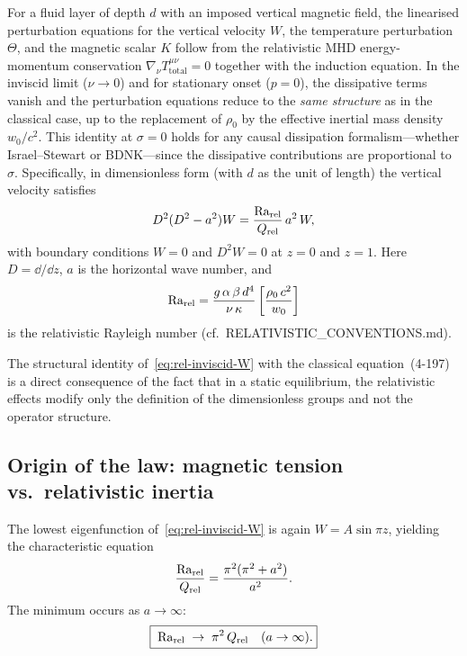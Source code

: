 For a fluid layer of depth $d$ with an imposed vertical magnetic field,
the linearised perturbation equations for the vertical velocity $W$,
the temperature perturbation $\Theta$, and the magnetic scalar $K$
follow from the relativistic MHD energy-momentum conservation
$\nabla_{\nu}T^{\mu\nu}_{\mathrm{total}} = 0$ together with the
induction equation.  In the inviscid limit ($\nu\to 0$) and for
stationary onset ($p = 0$), the dissipative terms vanish
and the perturbation equations reduce to the \emph{same structure}
as in the classical case, up to the replacement of $\rho_{0}$ by the
effective inertial mass density $w_{0}/c^{2}$.  This identity at
$\sigma=0$ holds for any causal dissipation formalism---whether
Israel--Stewart or BDNK---since the dissipative contributions are
proportional to~$\sigma$.  Specifically, in
dimensionless form (with $d$ as the unit of length) the vertical
velocity satisfies
\begin{equation}
  D^{2}(D^{2}-a^{2})W = \frac{\mathrm{Ra}_{\mathrm{rel}}}{Q_{\mathrm{rel}}}\,a^{2}\,W ,
  \label{eq:rel-inviscid-W}
\end{equation}
with boundary conditions $W = 0$ and $D^{2}W = 0$ at $z = 0$ and $z=1$.
Here $D = \dd/\dd z$, $a$ is the horizontal wave number, and
\begin{equation}
  \mathrm{Ra}_{\mathrm{rel}} = \frac{g\,\alpha\,\beta\,d^{4}}{\nu\,\kappa}
           \left[\frac{\rho_{0}\,c^{2}}{w_{0}}\right]
  \label{eq:rel-Rarel-Q}
\end{equation}
is the relativistic Rayleigh number (cf.\ RELATIVISTIC\_CONVENTIONS.md).

The structural identity of~\eqref{eq:rel-inviscid-W} with the classical
equation~(4-197) is a direct consequence of the fact that in a static
equilibrium, the relativistic effects modify only the definition of
the dimensionless groups and not the operator structure.

\subsection{Origin of the law: magnetic tension vs.\ relativistic inertia}
\label{subsec:rel-45-origin}

The lowest eigenfunction of~\eqref{eq:rel-inviscid-W} is again
$W = A\sin\pi z$, yielding the characteristic equation
\begin{equation}
  \frac{\mathrm{Ra}_{\mathrm{rel}}}{Q_{\mathrm{rel}}}
  = \frac{\pi^{2}(\pi^{2}+a^{2})}{a^{2}} .
  \label{eq:rel-RoverQ}
\end{equation}
The minimum occurs as $a\to\infty$:
\begin{equation}
  \boxed{\;\mathrm{Ra}_{\mathrm{rel}} \;\to\; \pi^{2}\,Q_{\mathrm{rel}} \quad (a\to\infty).}
  \label{eq:rel-pi2Q-law}
\end{equation}

